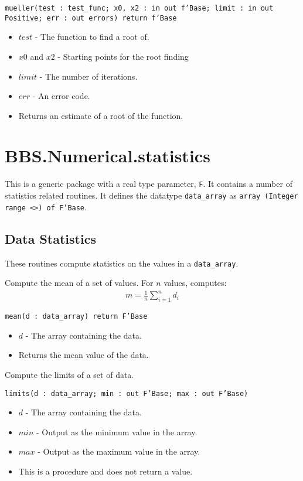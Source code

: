 \documentclass[10pt, openany]{book}
\newcommand{\function}[1]{\texttt{#1}}
\newcommand{\datatype}[1]{\texttt{#1}}
\begin{document}
\function{mueller(test : test\_func; x0, x2 : in out f'Base; limit : in out Positive; err : out errors) return f'Base}
\begin{itemize}
  \item $test$ - The function to find a root of.
  \item $x0$ and $x2$ - Starting points for the root finding
  \item $limit$ - The number of iterations.
  \item $err$ - An error code.
  \item Returns an estimate of a root of the function.
\end{itemize}

\section{BBS.Numerical.statistics}
This is a generic package with a real type parameter, \datatype{F}.  It contains a number of statistics related routines.  It defines the datatype \datatype{data\_array} as \datatype{array (Integer range <>) of F'Base}.

\subsection{Data Statistics}
These routines compute statistics on the values in a \datatype{data\_array}.

Compute the mean of a set of values.  For $n$ values, computes:
\begin{align*}
  m = \frac{1}{n}\sum_{i=1}^n d_i
\end{align*}

\function{mean(d : data\_array) return F'Base}
\begin{itemize}
  \item $d$ - The array containing the data.
  \item Returns the mean value of the data.
\end{itemize}

Compute the limits of a set of data.

\function{limits(d : data\_array; min : out F'Base; max : out F'Base)}
\begin{itemize}
  \item $d$ - The array containing the data.
  \item $min$ - Output as the minimum value in the array.
  \item $max$ - Output as the maximum value in the array.
  \item This is a procedure and does not return a value.
\end{itemize}
\end{document}
